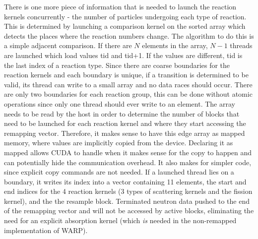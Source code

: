 There is one more piece of information that is needed to launch the reaction kernels concurrently - the number of particles undergoing each type of reaction.  This is determined by launching a comparison kernel on the sorted array which detects the places where the reaction numbers change.  The algorithm to do this is a simple adjacent comparison.  If there are $N$ elements in the array, $N-1$ threads are launched which load values tid and tid+1.  If the values are different, tid is the last index of a reaction type.  Since there are coarse boundaries for the reaction kernels and each boundary is unique, if a transition is determined to be valid, its thread can write to a small array and no data races should occur.  There are only two boundaries for each reaction group, this can be done without atomic operations since only one thread should ever write to an element.  The array needs to be read by the host in order to determine the number of blocks that need to be launched for each reaction kernel and where they start accessing the remapping vector.  Therefore, it makes sense to have this edge array as mapped memory, where values are implicitly copied from the device.  Declaring it as mapped allows CUDA to handle when it makes sense for the copy to happen and can potentially hide the communication overhead.  It also makes for simpler code, since explicit copy commands are not needed.  If a launched thread lies on a boundary, it writes its index into a vector containing 11 elements, the start and end indices for the 4 reaction kernels (3 types of scattering kernels and the fission kernel), and the the resample block.  Terminated neutron data pushed to the end of the remapping vector and will not be accessed by active blocks, eliminating the need for an explicit absorption kernel (which \emph{is} needed in the non-remapped implementation of WARP).

